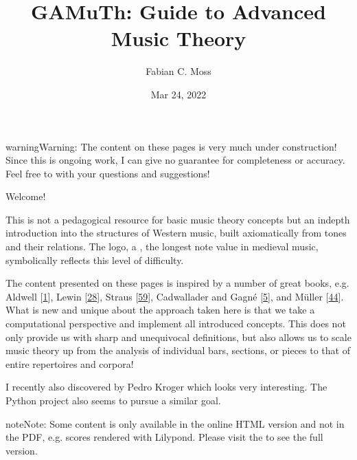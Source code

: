\documentclass[letterpaper,10pt,english]{sphinxmanual}
\title{GAMuTh: Guide to Advanced Music Theory}
\date{Mar 24, 2022}
\author{Fabian C.\@{} Moss}
\begin{document}
\pagestyle{empty}
\sphinxmaketitle
\pagestyle{plain}
\sphinxtableofcontents
\pagestyle{normal}
\label{\detokenize{index::doc}}


\begin{sphinxadmonition}{warning}{Warning:}
\sphinxAtStartPar
The content on these pages is very much under construction!
Since this is ongoing work, I can give no guarantee for completeness or accuracy.
Feel free to  with your questions and suggestions!
\end{sphinxadmonition}

\sphinxAtStartPar
Welcome!

\sphinxAtStartPar
This is not a pedagogical resource for basic music theory concepts
but an in\sphinxhyphen{}depth introduction into the structures of Western music,
built axiomatically from tones and their relations.
The logo, a , the longest note value in medieval music,
symbolically reflects this level of difficulty.

\sphinxAtStartPar
The content presented on these pages is inspired by a number
of great books, e.g.
Aldwell  {[}\hyperlink{cite.8_bibliography:id12}{1}{]}, Lewin {[}\hyperlink{cite.8_bibliography:id2}{28}{]}, Straus {[}\hyperlink{cite.8_bibliography:id3}{59}{]},
Cadwallader and Gagné {[}\hyperlink{cite.8_bibliography:id18}{5}{]}, and Müller {[}\hyperlink{cite.8_bibliography:id24}{44}{]}.
What is new and unique about the approach taken here is that we take
a computational perspective and implement all introduced concepts.
This does not only provide us with sharp and unequivocal definitions,
but also allows us to scale music theory up from the analysis of individual
bars, sections, or pieces to that of entire repertoires and corpora!

\sphinxAtStartPar
I recently also discovered  by Pedro Kroger
which looks very interesting.
The Python project  also seems to pursue a similar goal.

\begin{sphinxadmonition}{note}{Note:}
\sphinxAtStartPar
Some content is only available in the online HTML version and not in the PDF,
e.g. scores rendered with Lilypond. Please visit the  to see the full version.
\end{sphinxadmonition}
\end{document}
